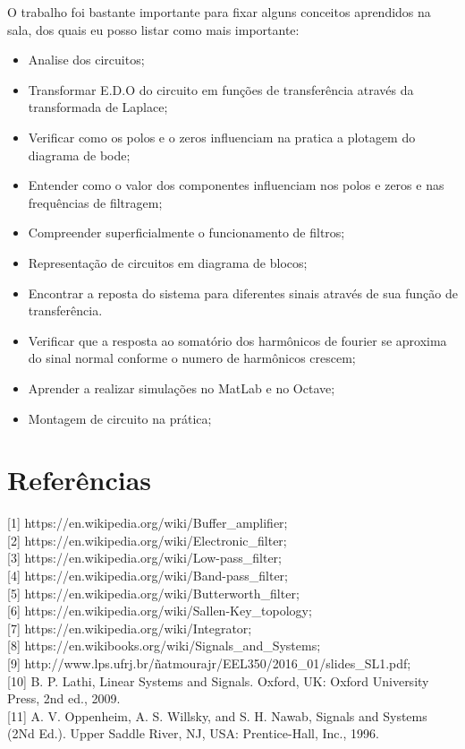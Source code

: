 \documentclass[a4paper, 12pt]{article}
\begin{document}
	O trabalho foi bastante importante para fixar alguns conceitos aprendidos na sala, dos quais eu posso listar como mais importante:

		\begin{itemize}
			\item Analise dos circuitos;
			\item Transformar E.D.O do circuito em funções de transferência através da transformada de Laplace;
			\item Verificar como os polos e o zeros influenciam na pratica a plotagem do diagrama de bode;
			\item Entender como o valor dos componentes influenciam nos polos e zeros e nas frequências de filtragem;
			\item Compreender superficialmente o funcionamento de filtros;
			\item Representação de circuitos em diagrama de blocos;
			\item Encontrar a reposta do sistema para diferentes sinais através de sua função de transferência.
			\item Verificar que a resposta ao somatório dos harmônicos de fourier se aproxima do sinal normal conforme o numero de harmônicos crescem;
			\item Aprender a realizar simulações no MatLab e no Octave;
			\item Montagem de circuito na prática;
		\end{itemize}

	\newpage
	\section{Referências}

	[1] https://en.wikipedia.org/wiki/Buffer\_amplifier; \\

	[2] https://en.wikipedia.org/wiki/Electronic\_filter;\\

	[3] https://en.wikipedia.org/wiki/Low-pass\_filter;\\

	[4] https://en.wikipedia.org/wiki/Band-pass\_filter;\\

	[5] https://en.wikipedia.org/wiki/Butterworth\_filter;\\

	[6] https://en.wikipedia.org/wiki/Sallen-Key\_topology;\\

	[7] https://en.wikipedia.org/wiki/Integrator;\\

	[8] https://en.wikibooks.org/wiki/Signals\_and\_Systems;\\

	[9] http://www.lps.ufrj.br/\~natmourajr/EEL350/2016\_01/slides\_SL1.pdf; \\

	[10] B. P. Lathi, Linear Systems and Signals. Oxford, UK: Oxford University Press, 2nd ed., 2009. \\

	[11] A. V. Oppenheim, A. S. Willsky, and S. H. Nawab, Signals and Systems (2Nd Ed.). Upper Saddle River, NJ, USA: Prentice-Hall, Inc., 1996.
\end{document}
